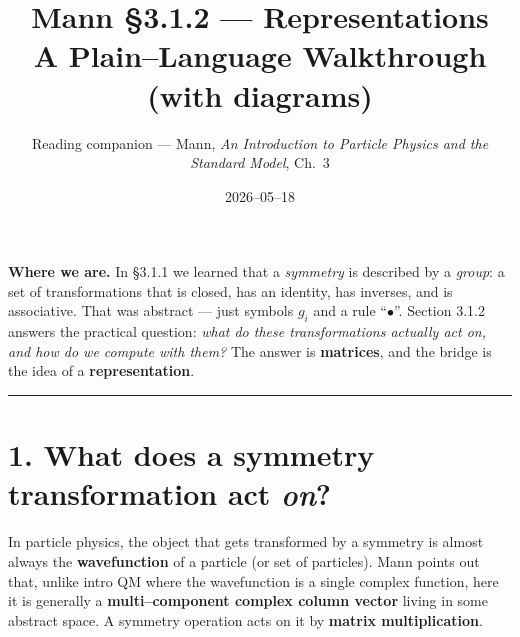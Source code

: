 \documentclass[11pt]{article}
\title{\textbf{Mann \S3.1.2 --- Representations}\\[2pt]
\large A Plain--Language Walkthrough (with diagrams)}
\author{Reading companion --- Mann, \emph{An Introduction to Particle Physics
and the Standard Model}, Ch.~3}
\date{2026--05--18}
\begin{document}
\maketitle

\noindent\textbf{Where we are.} In \S3.1.1 we learned that a \emph{symmetry}
is described by a \emph{group}: a set of transformations that is closed, has an
identity, has inverses, and is associative. That was abstract --- just symbols
$g_i$ and a rule ``$\bullet$''. Section 3.1.2 answers the practical question:
\emph{what do these transformations actually act on, and how do we compute with
them?} The answer is \textbf{matrices}, and the bridge is the idea of a
\textbf{representation}.

\bigskip
\hrule
\bigskip

\section*{1. What does a symmetry transformation act \emph{on}?}

In particle physics, the object that gets transformed by a symmetry is almost
always the \textbf{wavefunction} of a particle (or set of particles). Mann
points out that, unlike intro QM where the wavefunction is a single complex
function, here it is generally a \textbf{multi--component complex column
vector} living in some abstract space. A symmetry operation acts on it by
\textbf{matrix multiplication}.
\end{document}
